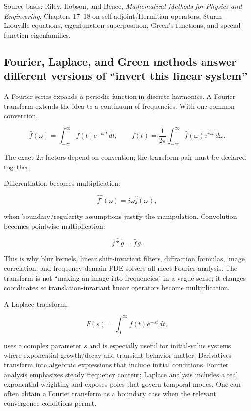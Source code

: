 Source basis: Riley, Hobson, and Bence, \emph{Mathematical Methods for Physics and Engineering}, Chapters 17--18 on self-adjoint/Hermitian operators, Sturm--Liouville equations, eigenfunction superposition, Green's functions, and special-function eigenfamilies.

\subsection{Fourier, Laplace, and Green methods answer different versions of ``invert this linear system''}\label{02-foundations-ii-ch025-fourier-laplace-and-green-methods-answer-different-versions-of-invert-this-linear-system}

A Fourier series expands a periodic function in discrete harmonics. A Fourier transform extends the idea to a continuum of frequencies. With one common convention,

\[
\hat f(\omega)
=
\int_{-\infty}^{\infty}
f(t)e^{-i\omega t}\,dt,
\qquad
f(t)
=
\frac{1}{2\pi}
\int_{-\infty}^{\infty}
\hat f(\omega)e^{i\omega t}\,d\omega.
\]

The exact \(2\pi\) factors depend on convention; the transform pair must be declared together.

Differentiation becomes multiplication:

\[
\widehat{f'}(\omega)=i\omega\hat f(\omega),
\]

when boundary/regularity assumptions justify the manipulation. Convolution becomes pointwise multiplication:

\[
\widehat{f*g}
=
\hat f\,\hat g.
\]

This is why blur kernels, linear shift-invariant filters, diffraction formulas, image correlation, and frequency-domain PDE solvers all meet Fourier analysis. The transform is not ``making an image into frequencies'' in a vague sense; it changes coordinates so translation-invariant linear operators become multiplication.

A Laplace transform,

\[
F(s)
=
\int_0^\infty
f(t)e^{-st}\,dt,
\]

uses a complex parameter \(s\) and is especially useful for initial-value systems where exponential growth/decay and transient behavior matter. Derivatives transform into algebraic expressions that include initial conditions. Fourier analysis emphasizes steady frequency content; Laplace analysis includes a real exponential weighting and exposes poles that govern temporal modes. One can often obtain a Fourier transform as a boundary case when the relevant convergence conditions permit.

